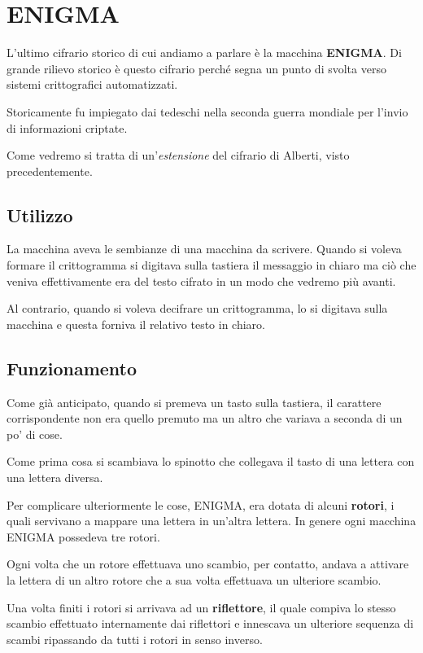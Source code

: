 \section{ENIGMA}
L'ultimo cifrario storico di cui andiamo a parlare \`e la macchina \textbf{ENIGMA}. Di grande rilievo storico \`e questo
cifrario perch\'e segna un punto di svolta verso sistemi crittografici automatizzati.

Storicamente fu impiegato dai tedeschi nella seconda guerra mondiale per l'invio di informazioni criptate.

Come vedremo si tratta di un'\emph{estensione} del cifrario di Alberti, visto precedentemente.

\subsection{Utilizzo}
La macchina aveva le sembianze di una macchina da scrivere. Quando si voleva formare il crittogramma si digitava sulla
tastiera il messaggio in chiaro ma ci\`o che veniva effettivamente era del testo cifrato in un modo che vedremo pi\`u
avanti.

Al contrario, quando si voleva decifrare un crittogramma, lo si digitava sulla macchina e questa forniva il relativo testo
in chiaro.

\subsection{Funzionamento}
Come gi\`a anticipato, quando si premeva un tasto sulla tastiera, il carattere corrispondente non era quello premuto ma
un altro che variava a seconda di un po' di cose.

Come prima cosa si scambiava lo spinotto che collegava il tasto di una lettera con una lettera diversa.

Per complicare ulteriormente le cose, ENIGMA, era dotata di alcuni \textbf{rotori}, i quali servivano a mappare una
lettera in un'altra lettera. In genere ogni macchina ENIGMA possedeva tre rotori.

Ogni volta che un rotore effettuava uno scambio, per contatto, andava a attivare la lettera di un altro rotore che a sua
volta effettuava un ulteriore scambio.

Una volta finiti i rotori si arrivava ad un \textbf{riflettore}, il quale compiva lo stesso scambio effettuato internamente
dai riflettori e innescava un ulteriore sequenza di scambi ripassando da tutti i rotori in senso inverso.

